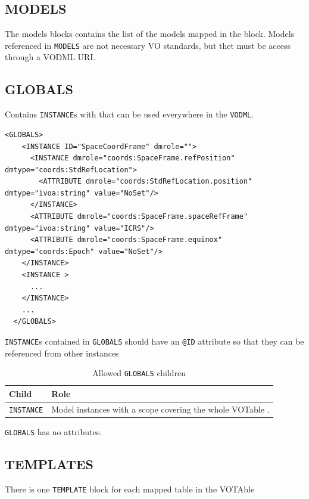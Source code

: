 \documentclass[11pt,a4paper]{ivoa}
\begin{document}
\subsection{MODELS}

The models blocks contains the list of the models mapped in the block. Models referenced in \texttt{MODELS} are not necessary VO standards, but thet must be access through a VODML URI.

\subsection{GLOBALS}

Contains  \texttt{INSTANCE}s with that can be used everywhere in the \texttt{VODML}.


\begin{lstlisting}[caption={INSTANCE bloc example},captionpos=b]
  <GLOBALS>
    <INSTANCE ID="SpaceCoordFrame" dmrole="">
      <INSTANCE dmrole="coords:SpaceFrame.refPosition" dmtype="coords:StdRefLocation">
        <ATTRIBUTE dmrole="coords:StdRefLocation.position" dmtype="ivoa:string" value="NoSet"/>
      </INSTANCE>
      <ATTRIBUTE dmrole="coords:SpaceFrame.spaceRefFrame" dmtype="ivoa:string" value="ICRS"/>
      <ATTRIBUTE dmrole="coords:SpaceFrame.equinox" dmtype="coords:Epoch" value="NoSet"/>
    </INSTANCE>
    <INSTANCE >
      ... 
    </INSTANCE>
    ...
  </GLOBALS>
\end{lstlisting}

\texttt{INSTANCE}s contained in \texttt{GLOBALS} should have an  \texttt{@ID} attribute so that they can be referenced from other instances


\begin{table}[ht!]
     \begin{tabular}{|p{3cm}|p{7cm}|}
       \hline Child &  Role\\
       \hline  \texttt{INSTANCE}    &  Model instances with a scope covering the whole VOTable . \\       
       \hline 
     \end{tabular}
     \caption{Allowed  \texttt{GLOBALS} children} 
 \end{table}

 \texttt{GLOBALS} has no attributes. 


\subsection{TEMPLATES}

There is one \texttt{TEMPLATE} block for each mapped table in the VOTAble 
\end{document}
